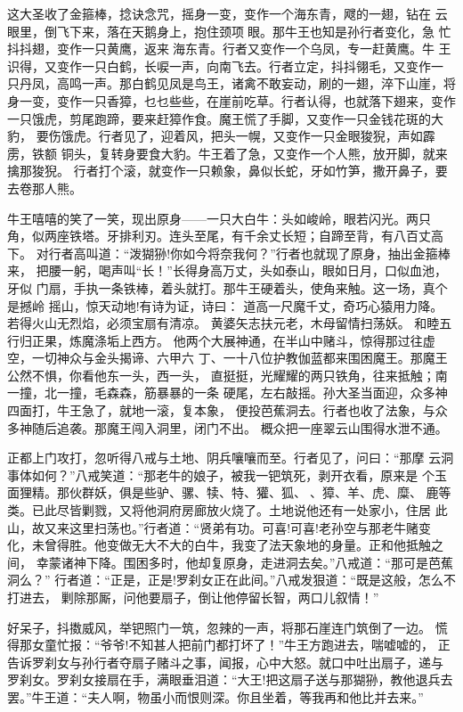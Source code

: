 这大圣收了金箍棒，捻诀念咒，摇身一变，变作一个海东青，飕的一翅，钻在
云眼里，倒飞下来，落在天鹅身上，抱住颈项眼。那牛王也知是孙行者变化，急
忙抖抖翅，变作一只黄鹰，返来海东青。行者又变作一个乌凤，专一赶黄鹰。牛
王识得，又变作一只白鹤，长唳一声，向南飞去。行者立定，抖抖翎毛，又变作一
只丹凤，高鸣一声。那白鹤见凤是鸟王，诸禽不敢妄动，刷的一翅，淬下山崖，将
身一变，变作一只香獐，乜乜些些，在崖前吃草。行者认得，也就落下翅来，变作
一只饿虎，剪尾跑蹄，要来赶獐作食。魔王慌了手脚，又变作一只金钱花斑的大豹，
要伤饿虎。行者见了，迎着风，把头一幌，又变作一只金眼狻猊，声如霹雳，铁额
铜头，复转身要食大豹。牛王着了急，又变作一个人熊，放开脚，就来擒那狻猊。
行者打个滚，就变作一只赖象，鼻似长蛇，牙如竹笋，撒开鼻子，要去卷那人熊。

牛王嘻嘻的笑了一笑，现出原身——一只大白牛：头如峻岭，眼若闪光。两只
角，似两座铁塔。牙排利刃。连头至尾，有千余丈长短；自蹄至背，有八百丈高下。
对行者高叫道：“泼猢狲!你如今将奈我何？”行者也就现了原身，抽出金箍棒来，
把腰一躬，喝声叫“长！”长得身高万丈，头如泰山，眼如日月，口似血池，牙似
门扇，手执一条铁棒，着头就打。那牛王硬着头，使角来触。这一场，真个是撼岭
摇山，惊天动地!有诗为证，诗曰：
道高一尺魔千丈，奇巧心猿用力降。
若得火山无烈焰，必须宝扇有清凉。
黄婆矢志扶元老，木母留情扫荡妖。
和睦五行归正果，炼魔涤垢上西方。
他两个大展神通，在半山中赌斗，惊得那过往虚空，一切神众与金头揭谛、六甲六
丁、一十八位护教伽蓝都来围困魔王。那魔王公然不惧，你看他东一头，西一头，
直挺挺，光耀耀的两只铁角，往来抵触；南一撞，北一撞，毛森森，筋暴暴的一条
硬尾，左右敲摇。孙大圣当面迎，众多神四面打，牛王急了，就地一滚，复本象，
便投芭蕉洞去。行者也收了法象，与众多神随后追袭。那魔王闯入洞里，闭门不出。
概众把一座翠云山围得水泄不通。

正都上门攻打，忽听得八戒与土地、阴兵嚷嚷而至。行者见了，问曰：“那摩
云洞事体如何？”八戒笑道：“那老牛的娘子，被我一钯筑死，剥开衣看，原来是
个玉面狸精。那伙群妖，俱是些驴、骡、犊、特、獾、狐、、獐、羊、虎、糜、
鹿等类。已此尽皆剿戮，又将他洞府房廊放火烧了。土地说他还有一处家小，住居
此山，故又来这里扫荡也。”行者道：“贤弟有功。可喜!可喜!老孙空与那老牛赌变
化，未曾得胜。他变做无大不大的白牛，我变了法天象地的身量。正和他抵触之间，
幸蒙诸神下降。围困多时，他却复原身，走进洞去矣。”八戒道：“那可是芭蕉洞么？”
行者道：“正是，正是!罗刹女正在此间。”八戒发狠道：“既是这般，怎么不打进去，
剿除那厮，问他要扇子，倒让他停留长智，两口儿叙情！”

好呆子，抖擞威风，举钯照门一筑，忽辣的一声，将那石崖连门筑倒了一边。
慌得那女童忙报：“爷爷!不知甚人把前门都打坏了！”牛王方跑进去，喘嘘嘘的，
正告诉罗刹女与孙行者夺扇子赌斗之事，闻报，心中大怒。就口中吐出扇子，递与
罗刹女。罗刹女接扇在手，满眼垂泪道：“大王!把这扇子送与那猢狲，教他退兵去
罢。”牛王道：“夫人啊，物虽小而恨则深。你且坐着，等我再和他比并去来。”

